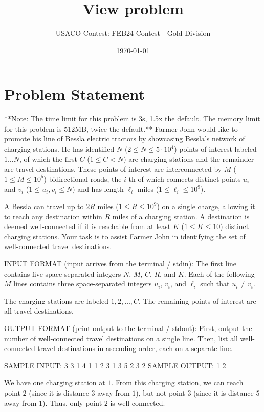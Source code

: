 \documentclass[12pt]{article}
\title{View problem}
\author{USACO Contest: FEB24 Contest - Gold Division}
\date{\today}
\begin{document}
\maketitle

\section*{Problem Statement}


**Note: The time limit for this problem is 3s, 1.5x the default. The memory
limit for this problem is 512MB, twice the default.**
Farmer John would like to promote his line of Bessla electric tractors by
showcasing Bessla's network of charging stations. He has identified $N$
($2\le N\le 5\cdot 10^4$) points of interest labeled $1\dots N$, of which the
first $C$ ($1\le C < N$) are charging stations and the remainder are travel
destinations. These points of interest are interconnected by $M$
($1\le M\le 10^5$) bidirectional roads, the $i$-th of which connects distinct
points $u_i$ and $v_i$ ($1\le u_i, v_i\le N$) and has length $\ell_i$ miles
($1\le\ell_i\le 10^9$).

A Bessla can travel up to $2R$ miles ($1\le R\le 10^9$) on a single charge,
allowing it to reach any destination within $R$ miles of a charging station. A
destination is deemed well-connected if it is reachable from at least $K$
($1\le K\le 10$) distinct charging stations. Your task is to assist Farmer John
in identifying the set of well-connected travel destinations.

INPUT FORMAT (input arrives from the terminal / stdin):
The first line contains five space-separated integers $N$, $M$, $C$, $R$, and
$K$. Each of the following $M$ lines contains three space-separated integers
$u_i$, $v_i$, and $\ell_i$ such that $u_i\neq v_i$.

The charging stations are labeled $1, 2, \ldots, C$. The remaining points of
interest are all travel destinations.

OUTPUT FORMAT (print output to the terminal / stdout):
First, output the number of well-connected travel destinations on a single line.
Then, list all well-connected travel destinations in ascending order, each on a
separate line.

SAMPLE INPUT:
3 3 1 4 1
1 2 3
1 3 5
2 3 2
SAMPLE OUTPUT: 
1
2

We have one charging station at $1$. From this charging station, we can reach
point $2$ (since it is distance $3$ away from $1$), but not point $3$ (since it
is distance $5$ away from $1$). Thus, only point $2$ is well-connected.
\end{document}
